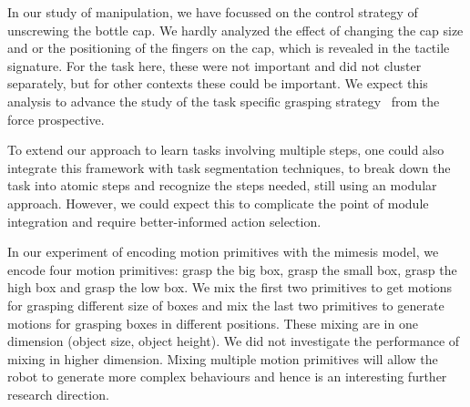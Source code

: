 In our study of manipulation, we have focussed on the control strategy of unscrewing
the bottle cap. We hardly analyzed the effect of changing the cap size and or
the positioning of the fingers on the cap, which is revealed in the
tactile signature. For the task here, these were not important and
did not cluster separately, but for other contexts these could be
important. We expect this analysis to advance the study of the task specific grasping
strategy~\citep{el2013generation,dang2014semantic} from the force prospective.

To extend our approach to learn tasks involving multiple steps, one
could also integrate this framework with task segmentation techniques,
to break down the task into atomic steps and recognize the steps
needed, still using an modular approach. However, we could expect this
to complicate the point of module integration and require
better-informed action selection.

In our experiment of encoding motion primitives with the mimesis model, we encode four motion primitives: grasp the big box, grasp the small box, grasp the high box and grasp the low box. We mix the first two primitives to get motions for grasping different size of boxes and mix the last two primitives to generate motions for grasping boxes in different positions. These mixing are in one dimension (object size, object height). We did not investigate the performance of mixing in higher dimension. Mixing multiple motion primitives will allow the robot to generate more complex behaviours and hence is an interesting further research direction.

%
%
%
%
%

